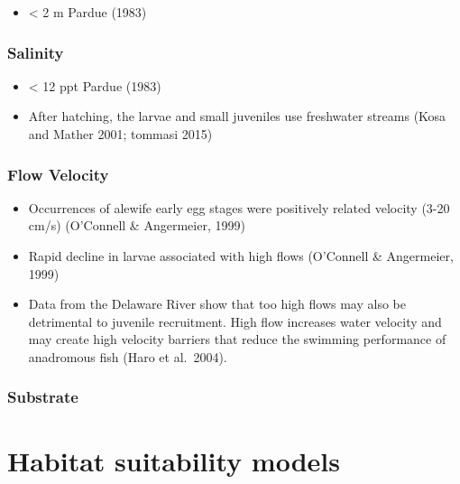 \documentclass[
]{book}
\providecommand{\tightlist}{%
  \setlength{\itemsep}{0pt}\setlength{\parskip}{0pt}}
\begin{document}
\begin{itemize}
\tightlist
\item
  \textless{} 2 m Pardue (1983)
\end{itemize}

\hypertarget{salinity-2}{%
\subsubsection{Salinity}\label{salinity-2}}

\begin{itemize}
\item
  \textless{} 12 ppt Pardue (1983)
\item
  After hatching, the larvae and small juveniles use freshwater streams (Kosa and Mather 2001; tommasi 2015)
\end{itemize}

\hypertarget{flow-velocity-2}{%
\subsubsection{Flow Velocity}\label{flow-velocity-2}}

\begin{itemize}
\item
  Occurrences of alewife early egg stages were positively related velocity (3-20 cm/s) (O'Connell \& Angermeier, 1999)
\item
  Rapid decline in larvae associated with high flows (O'Connell \& Angermeier, 1999)
\item
  Data from the Delaware River show that too high flows may also be detrimental to juvenile recruitment. High flow increases water velocity and may create high velocity barriers that reduce the swimming performance of anadromous fish (Haro et al.~2004).
\end{itemize}

\hypertarget{substrate-2}{%
\subsubsection{Substrate}\label{substrate-2}}

\hypertarget{habitat-suitability-models}{%
\section{Habitat suitability models}\label{habitat-suitability-models}}
\end{document}

